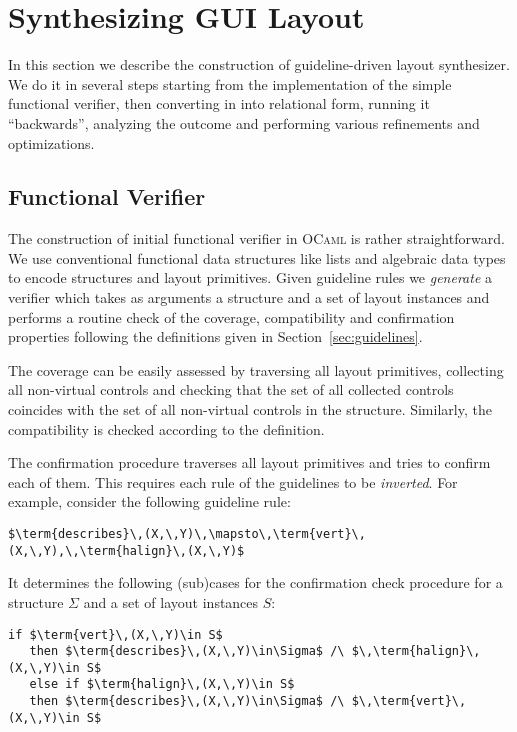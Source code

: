 
\section{Synthesizing GUI Layout}
\label{sec:synthesizing}

In this section we describe the construction of guideline-driven layout synthesizer. We do it in several steps starting
from the implementation of the simple functional verifier, then converting in into relational form, running it ``backwards'',
analyzing the outcome and performing various refinements and optimizations.


\subsection{Functional Verifier}

The construction of initial functional verifier in \textsc{OCaml} is rather straightforward. We use conventional functional
data structures like lists and algebraic data types to encode structures and layout primitives. Given guideline rules we
\emph{generate} a verifier which takes as arguments a structure and a set of layout instances and performs a routine check of
the coverage, compatibility and confirmation properties following the definitions given in Section~\ref{sec:guidelines}.

The coverage can be easily assessed by traversing all layout primitives, collecting all non-virtual controls and
checking that the set of all collected controls coincides with the set of all non-virtual controls in the structure.
Similarly, the compatibility is checked according to the definition.

The confirmation procedure traverses all layout primitives and tries to confirm each of them. This requires each
rule of the guidelines to be \emph{inverted}. For example, consider the following guideline rule:

\begin{lstlisting}[language=ocanren,basicstyle=\small]
   $\term{describes}\,(X,\,Y)\,\mapsto\,\term{vert}\,(X,\,Y),\,\term{halign}\,(X,\,Y)$
\end{lstlisting}

It determines the following (sub)cases for the confirmation check procedure for a structure $\Sigma$ and
a set of layout instances $S$:

\begin{lstlisting}[language=ocanren,basicstyle=\small]
   if $\term{vert}\,(X,\,Y)\in S$
   then $\term{describes}\,(X,\,Y)\in\Sigma$ /\ $\,\term{halign}\,(X,\,Y)\in S$
   else if $\term{halign}\,(X,\,Y)\in S$
   then $\term{describes}\,(X,\,Y)\in\Sigma$ /\ $\,\term{vert}\,(X,\,Y)\in S$
\end{lstlisting}

